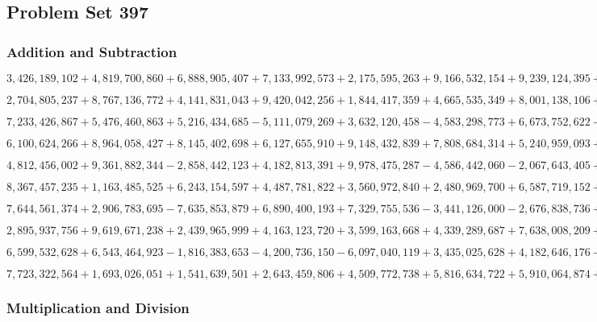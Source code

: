 \hypertarget{problem-set-397}{%
\subsection{Problem Set 397}\label{problem-set-397}}

\hypertarget{addition-and-subtraction}{%
\subsubsection{Addition and
Subtraction}\label{addition-and-subtraction}}

\(3,426,189,102+4,819,700,860+6,888,905,407+7,133,992,573+2,175,595,263+9,166,532,154+9,239,124,395+6,760,961,180+8,802,920,049+9,274,757,251\)

\(2,704,805,237+8,767,136,772+4,141,831,043+9,420,042,256+1,844,417,359+4,665,535,349+8,001,138,106+2,852,133,066+8,289,022,870+9,735,114,854\)

\(7,233,426,867+5,476,460,863+5,216,434,685-5,111,079,269+3,632,120,458-4,583,298,773+6,673,752,622-9,393,509,706-5,948,824,363+8,683,429,117\)

\(6,100,624,266+8,964,058,427+8,145,402,698+6,127,655,910+9,148,432,839+7,808,684,314+5,240,959,093+7,116,749,645+1,087,370,783+2,003,994,326\)

\(4,812,456,002+9,361,882,344-2,858,442,123+4,182,813,391+9,978,475,287-4,586,442,060-2,067,643,405+3,748,219,532-3,576,363,119+1,733,715,010\)

\(8,367,457,235+1,163,485,525+6,243,154,597+4,487,781,822+3,560,972,840+2,480,969,700+6,587,719,152+4,716,436,904+5,814,714,939+3,387,468,933\)

\(7,644,561,374+2,906,783,695-7,635,853,879+6,890,400,193+7,329,755,536-3,441,126,000-2,676,838,736+2,266,751,332-4,653,706,797+1,859,724,796\)

\(2,895,937,756+9,619,671,238+2,439,965,999+4,163,123,720+3,599,163,668+4,339,289,687+7,638,008,209+5,561,343,754+4,940,206,902+6,090,707,190\)

\(6,599,532,628+6,543,464,923-1,816,383,653-4,200,736,150-6,097,040,119+3,435,025,628+4,182,646,176-8,633,560,857+8,973,182,729+8,602,669,327\)

\(7,723,322,564+1,693,026,051+1,541,639,501+2,643,459,806+4,509,772,738+5,816,634,722+5,910,064,874+4,927,231,272+8,122,488,582+8,935,905,850\)

\hypertarget{multiplication-and-division}{%
\subsubsection{Multiplication and
Division}\label{multiplication-and-division}}


